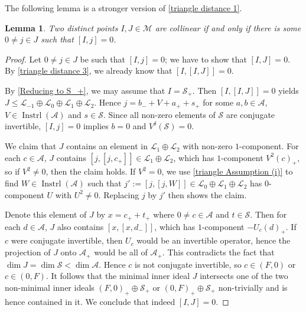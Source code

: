 \documentclass[oneside,a4paper]{amsart} %
\newtheorem{lemma}[theorem]{Lemma}
\theoremstyle{definition}
\DeclareMathOperator{\Inst}{Instrl}
\newcommand{\A}{\mathcal{A}}
\renewcommand{\SS}{\mathcal{S}}
\newcommand{\LL}{\mathcal{L}}
\newcommand{\M}{\mathcal{M}}
\numberwithin{equation}{section}
\begin{document}
The following lemma is a stronger version of \cref{triangle distance 1}.
\begin{lemma}
\label{triangle distance 1 looser}
	Two distinct points $I,J\in\M$ are collinear if and only if there is some $0 \neq j\in J$ such that $[I,j]=0$.
\end{lemma}
\begin{proof}
	Let $0 \neq j \in J$ be such that $[I,j]=0$; we have to show that $[I,J] = 0$.
	By \cref{triangle distance 3}, we already know that $[I,[I,J]] = 0$.
	
	By \cref{Reducing to S_+}, we may assume that $I=\SS_+$.
	Then $[I,[I,J]]=0$ yields $J \leq \LL_{-1} \oplus \LL_0 \oplus \LL_1 \oplus \LL_2$.
	Hence $j = b_- + V + a_+ + s_+$ for some $a,b\in\A$, $V\in\Inst (\A)$ and $s\in\SS$.
	Since all non-zero elements of $\SS$ are conjugate invertible, $[I,j]=0$ implies $b=0$ and $V^\delta (\SS)=0$.
	
	We claim that $J$ contains an element in $\LL_1 \oplus \LL_2$ with non-zero $1$-component.
	For each $c\in \A$, $J$ contains $[j,[j,c_+]]\in \LL_1 \oplus \LL_2$, which has $1$-component $V^2(c)_+$,
	so if $V^2\neq 0$, then the claim holds.
	If $V^2=0$, we use \cref{triangle Assumption (i)} to find $W\in\Inst (\A)$ such that $j' := [j,[j,W]]\in \LL_0 \oplus \LL_1 \oplus \LL_2$ has $0$-component $U$ with $U^2\neq 0$.
	Replacing $j$ by $j'$ then shows the claim.
	
	Denote this element of $J$ by $x = c_+ + t_+$ where $0 \neq c \in \A$ and $t \in \SS$.
	Then for each $d \in \A$, $J$ also contains $[x, [x, d_-]]$, which has $1$-component $-U_c(d)_+$.
	If $c$ were conjugate invertible, then $U_c$ would be an invertible operator, hence the projection of $J$ onto $\A_+$ would be all of $\A_+$.
	This contradicts the fact that $\dim J = \dim \SS < \dim \A$.
	Hence $c$ is not conjugate invertible, so $c \in (F,0)$ or $c \in (0,F)$.
	It follows that the minimal inner ideal $J$ intersects one of the two non-minimal inner ideals $(F,0)_+\oplus\SS_+$ or $(0,F)_+\oplus\SS_+$ non-trivially and is hence contained in it.
	We conclude that indeed $[I,J]=0$.
\end{proof}
\end{document}
